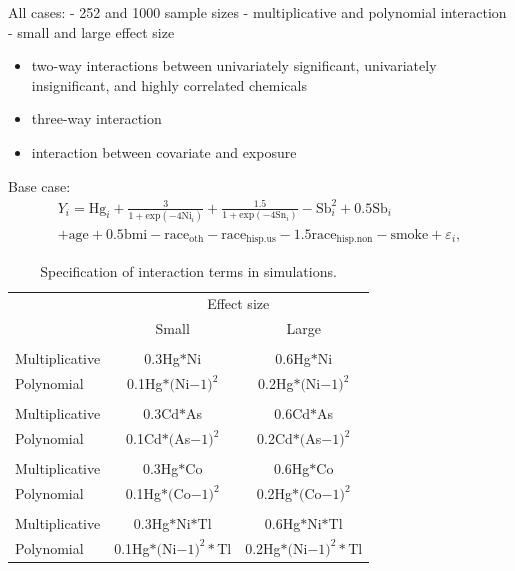 \documentclass[12pt, twoside]{amherstthesis}
\providecommand{\tightlist}{%
  \setlength{\itemsep}{0pt}\setlength{\parskip}{0pt}}
\begin{document}
All cases:
- 252 and 1000 sample sizes
- multiplicative and polynomial interaction
- small and large effect size
\begin{itemize}
\tightlist
\item
  two-way interactions between univariately significant, univariately insignificant, and highly correlated chemicals
\item
  three-way interaction
\item
  interaction between covariate and exposure
\end{itemize}
Base case:
\begin{multline*}
Y_i = \textrm{Hg}_i + \frac{3}{1+\textrm{exp}(-4\textrm{Ni}_i)} + \frac{1.5}{1+\textrm{exp}(-4\textrm{Sn}_i)} - \textrm{Sb}_i^2 + 0.5\textrm{Sb}_i\\
+ \textrm{age} + 0.5\textrm{bmi} - \textrm{race}_{\textrm{oth}} - \textrm{race}_{\textrm{hisp.us}} - 1.5\textrm{race}_{\textrm{hisp.non}} -\textrm{smoke} + \varepsilon_i,
\end{multline*}
\begin{table}

\caption{\label{tab:unnamed-chunk-2}Specification of interaction terms in simulations.}
\centering
\begin{tabular}[t]{>{\raggedright\arraybackslash}p{10em}cc}
\toprule
\multicolumn{1}{c}{ } & \multicolumn{2}{c}{Effect size} \\
\cmidrule(l{3pt}r{3pt}){2-3}
 & Small & Large\\
\midrule
\addlinespace[0.3em]
\multicolumn{3}{l}{\textbf{Univariately significant}}\\
\hspace{1em}Multiplicative & 0.3Hg$*$Ni & 0.6Hg$*$Ni\\
\hspace{1em}Polynomial & 0.1Hg$*($Ni$-1)^2$ & 0.2Hg$*($Ni$-1)^2$\\
\addlinespace[0.3em]
\multicolumn{3}{l}{\textbf{Univariately insignificant}}\\
\hspace{1em}Multiplicative & 0.3Cd$*$As & 0.6Cd$*$As\\
\hspace{1em}Polynomial & 0.1Cd$*($As$-1)^2$ & 0.2Cd$*($As$-1)^2$\\
\addlinespace[0.3em]
\multicolumn{3}{l}{\textbf{Highly correlated}}\\
\hspace{1em}Multiplicative & 0.3Hg$*$Co & 0.6Hg$*$Co\\
\hspace{1em}Polynomial & 0.1Hg$*($Co$-1)^2$ & 0.2Hg$*($Co$-1)^2$\\
\addlinespace[0.3em]
\multicolumn{3}{l}{\textbf{Three-way interaction}}\\
\hspace{1em}Multiplicative & 0.3Hg$*$Ni$*$Tl & 0.6Hg$*$Ni$*$Tl\\
\hspace{1em}Polynomial & 0.1Hg$*($Ni$-1)^2*$Tl & 0.2Hg$*($Ni$-1)^2*$Tl\\
\bottomrule
\end{tabular}
\end{table}
\end{document}
